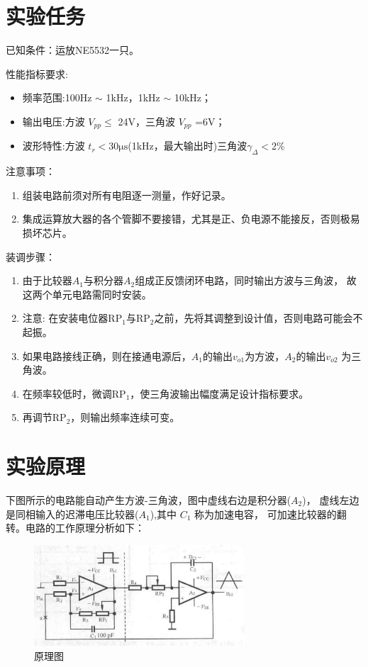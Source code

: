 \documentclass[a4paper,11pt,UTF8]{article}
\begin{document}
\section{实验任务}

已知条件：运放NE5532一只。

性能指标要求:

\begin{itemize}
	\item 频率范围:100Hz $\sim$ 1kHz，1kHz $\sim$ 10kHz；
	\item 输出电压:方波 $V_{pp} \leq$ 24V，三角波 $V_{pp}$ =6V；
	\item 波形特性:方波 $t_r<30\mathrm{\mu s}$(1kHz，最大输出时)三角波$\gamma_\Delta<2\%$
\end{itemize}

注意事项：

\begin{enumerate}
	\item 组装电路前须对所有电阻逐一测量，作好记录。 
	\item 集成运算放大器的各个管脚不要接错，尤其是正、负电源不能接反，否则极易损坏芯片。
\end{enumerate}

装调步骤：

\begin{enumerate}
	\item 由于比较器$A_1$与积分器$A_2$组成正反馈闭环电路，同时输出方波与三角波，
    故这两个单元电路需同时安装。
	\item 注意: 在安装电位器RP$_1$与RP$_2$之前，先将其调整到设计值，否则电路可能会不起振。
	\item 如果电路接线正确，则在接通电源后，$A_1$的输出$v_{o1}$为方波，$A_2$的输出$v_{o2}$
    为三角波。
	\item 在频率较低时，微调RP$_1$，使三角波输出幅度满足设计指标要求。
	\item 再调节RP$_2$，则输出频率连续可变。
	
\end{enumerate}

\section{实验原理}

下图所示的电路能自动产生方波-三角波，图中虚线右边是积分器($A_2$)，
虚线左边是同相输入的迟滞电压比较器($A_1$),其中 $C_1$ 称为加速电容，
可加速比较器的翻转。电路的工作原理分析如下：

\begin{figure}[H]
	\centering
	\includegraphics[width=0.7\textwidth]{3.1.png}
	\caption{原理图}
\end{figure}
\end{document}

